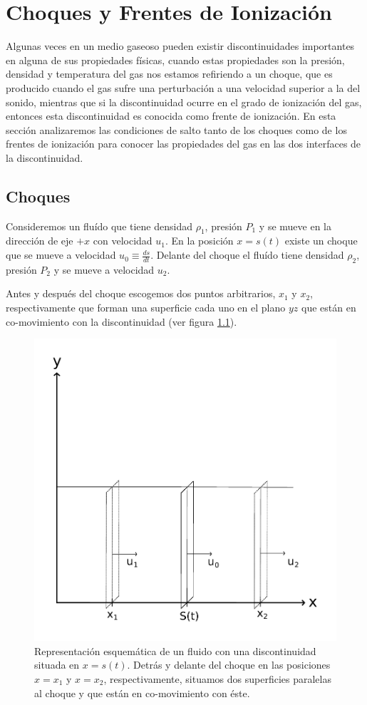 \appendix
\newcommand{\norm}[1]{\left\lVert#1\right\rVert}

\chapter{Choques y Frentes de Ionización}

Algunas veces en un medio gaseoso pueden existir discontinuidades importantes en alguna de sus propiedades físicas, cuando estas propiedades son la presión, densidad y temperatura del gas nos estamos refiriendo a un choque, que es producido cuando el gas sufre una perturbación a una velocidad superior a la del sonido, mientras que si la discontinuidad ocurre en el grado de ionización del gas, entonces esta discontinuidad es conocida como frente de ionización. En esta sección analizaremos las condiciones de salto tanto de los choques como de los frentes de ionización para conocer las propiedades del gas en las dos interfaces de la discontinuidad.
\section{Choques}

Consideremos un fluído que tiene densidad $\rho_1$, presión $P_1$ y se mueve en la dirección de eje $+x$ con velocidad $u_1$. En la posición $x = s(t)$ existe un choque que se mueve a velocidad $u_0\equiv \frac{ds}{dt}$. Delante del choque el fluído tiene densidad $\rho_2$, presión $P_2$ y se mueve a velocidad $u_2$.

Antes y después del choque escogemos dos puntos arbitrarios, $x_1$ y $x_2$, respectivamente que forman una superficie cada uno en el plano $yz$ que están en co-movimiento con la discontinuidad (ver figura \ref{fig:shock}). 

\begin{figure}
  \includegraphics[width=0.7\linewidth]{./Figures/shock}
  \caption{Representación esquemática de un fluido con una discontinuidad situada en $x=s(t)$. Detrás y delante del choque en las posiciones $x=x_1$ y $x=x_2$, respectivamente, situamos dos superficies paralelas al choque y que están en co-movimiento con éste.}
  \label{fig:shock}
\end{figure}

